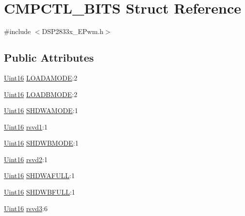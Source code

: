 \hypertarget{struct_c_m_p_c_t_l___b_i_t_s}{}\section{C\+M\+P\+C\+T\+L\+\_\+\+B\+I\+T\+S Struct Reference}
\label{struct_c_m_p_c_t_l___b_i_t_s}


{\ttfamily \#include $<$D\+S\+P2833x\+\_\+\+E\+Pwm.\+h$>$}

\subsection*{Public Attributes}
\begin{DoxyCompactItemize}
\item 
\hyperlink{_d_s_p2833x___device_8h_a59a9f6be4562c327cbfb4f7e8e18f08b}{Uint16} \hyperlink{struct_c_m_p_c_t_l___b_i_t_s_a851c50402575772ec638c931e265be55}{L\+O\+A\+D\+A\+M\+O\+D\+E}\+:2
\item 
\hyperlink{_d_s_p2833x___device_8h_a59a9f6be4562c327cbfb4f7e8e18f08b}{Uint16} \hyperlink{struct_c_m_p_c_t_l___b_i_t_s_ae4e8680b95e911401e2318268c792fff}{L\+O\+A\+D\+B\+M\+O\+D\+E}\+:2
\item 
\hyperlink{_d_s_p2833x___device_8h_a59a9f6be4562c327cbfb4f7e8e18f08b}{Uint16} \hyperlink{struct_c_m_p_c_t_l___b_i_t_s_afe97f77846f4a57d50e7b77170dd12f8}{S\+H\+D\+W\+A\+M\+O\+D\+E}\+:1
\item 
\hyperlink{_d_s_p2833x___device_8h_a59a9f6be4562c327cbfb4f7e8e18f08b}{Uint16} \hyperlink{struct_c_m_p_c_t_l___b_i_t_s_ae0addbec61528418f88a12c699167f2f}{rsvd1}\+:1
\item 
\hyperlink{_d_s_p2833x___device_8h_a59a9f6be4562c327cbfb4f7e8e18f08b}{Uint16} \hyperlink{struct_c_m_p_c_t_l___b_i_t_s_ab25286ed3730d338163a66f5c5199204}{S\+H\+D\+W\+B\+M\+O\+D\+E}\+:1
\item 
\hyperlink{_d_s_p2833x___device_8h_a59a9f6be4562c327cbfb4f7e8e18f08b}{Uint16} \hyperlink{struct_c_m_p_c_t_l___b_i_t_s_a66895cb0ae9534fd392151cfdc2913a7}{rsvd2}\+:1
\item 
\hyperlink{_d_s_p2833x___device_8h_a59a9f6be4562c327cbfb4f7e8e18f08b}{Uint16} \hyperlink{struct_c_m_p_c_t_l___b_i_t_s_a007be44f7c8438452d0ae4fc5e424930}{S\+H\+D\+W\+A\+F\+U\+L\+L}\+:1
\item 
\hyperlink{_d_s_p2833x___device_8h_a59a9f6be4562c327cbfb4f7e8e18f08b}{Uint16} \hyperlink{struct_c_m_p_c_t_l___b_i_t_s_a2a46088e417d228ceded88babad9186d}{S\+H\+D\+W\+B\+F\+U\+L\+L}\+:1
\item 
\hyperlink{_d_s_p2833x___device_8h_a59a9f6be4562c327cbfb4f7e8e18f08b}{Uint16} \hyperlink{struct_c_m_p_c_t_l___b_i_t_s_aecb25dc041fd5044acda993764831924}{rsvd3}\+:6
\end{DoxyCompactItemize}


